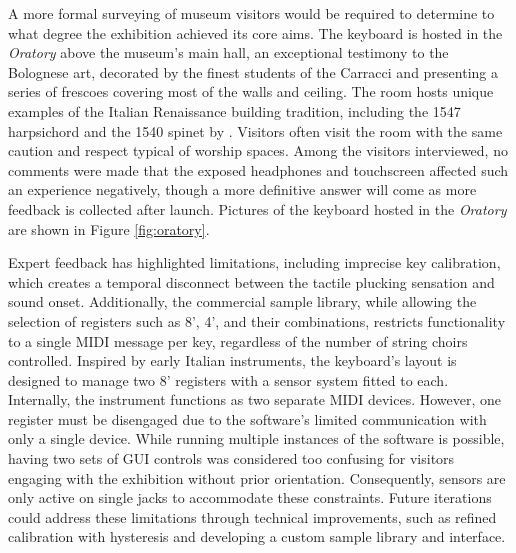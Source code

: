 
A more formal surveying of museum visitors would be required to determine to what degree the exhibition achieved its core aims.
The keyboard is hosted in the \emph{Oratory} above the museum's main hall, an exceptional testimony to the Bolognese art, decorated by the finest students of the Carracci and presenting a series of frescoes covering most of the walls and ceiling. The room hosts unique examples of the Italian Renaissance building tradition, including the 1547 harpsichord and the 1540 spinet by . Visitors often visit the room with the same caution and respect typical of worship spaces. Among the visitors interviewed, no comments were made that the exposed headphones and touchscreen affected such an experience negatively, though a more definitive answer will come as more feedback is collected after launch. Pictures of the keyboard hosted in the \emph{Oratory} are shown in Figure \ref{fig:oratory}.

Expert feedback has highlighted limitations, including imprecise key calibration, which creates a temporal disconnect between the tactile plucking sensation and sound onset. Additionally, the commercial sample library, while allowing the selection of registers such as 8', 4', and their combinations, restricts functionality to a single MIDI message per key, regardless of the number of string choirs controlled. Inspired by early Italian instruments, the keyboard's layout is designed to manage two 8' registers with a sensor system fitted to each. Internally, the instrument functions as two separate MIDI devices. However, one register must be disengaged due to the software's limited communication with only a single device. While running multiple instances of the software is possible, having two sets of GUI controls was considered too confusing for visitors engaging with the exhibition without prior orientation. Consequently, sensors are only active on single jacks to accommodate these constraints. Future iterations could address these limitations through technical improvements, such as refined calibration with hysteresis and developing a custom sample library and interface.


